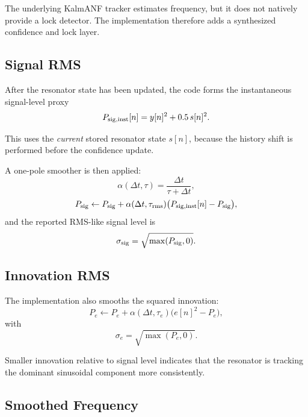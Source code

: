 \documentclass[conference]{IEEEtran}
\begin{document}
    The underlying KalmANF tracker estimates frequency, but it does not natively
    provide a lock detector. The implementation therefore adds a synthesized
    confidence and lock layer.

    \subsection{Signal RMS}

    After the resonator state has been updated, the code forms the instantaneous
    signal-level proxy
    \begin{equation}
        P_{\rm sig,inst}[n] = y[n]^2 + 0.5\,s[n]^2.
    \end{equation}

    This uses the \emph{current} stored resonator state $s[n]$, because the
    history shift is performed before the confidence update.

    A one-pole smoother is then applied:
    \begin{equation}
        \alpha(\Delta t,\tau) = \frac{\Delta t}{\tau+\Delta t},
    \end{equation}
    \begin{equation}
        P_{\rm sig} \leftarrow P_{\rm sig}
        + \alpha(\Delta t,\tau_{\rm rms})
        \bigl(P_{\rm sig,inst}[n]-P_{\rm sig}\bigr),
    \end{equation}
    and the reported RMS-like signal level is
    \begin{equation}
        \sigma_{\rm sig} = \sqrt{\max(P_{\rm sig},0)}.
    \end{equation}

    \subsection{Innovation RMS}

    The implementation also smooths the squared innovation:
    \begin{equation}
        P_e \leftarrow P_e + \alpha(\Delta t,\tau_e)\bigl(e[n]^2 - P_e\bigr),
    \end{equation}
    with
    \begin{equation}
        \sigma_e = \sqrt{\max(P_e,0)}.
    \end{equation}

    Smaller innovation relative to signal level indicates that the resonator is
    tracking the dominant sinusoidal component more consistently.

    \subsection{Smoothed Frequency}
\end{document}
